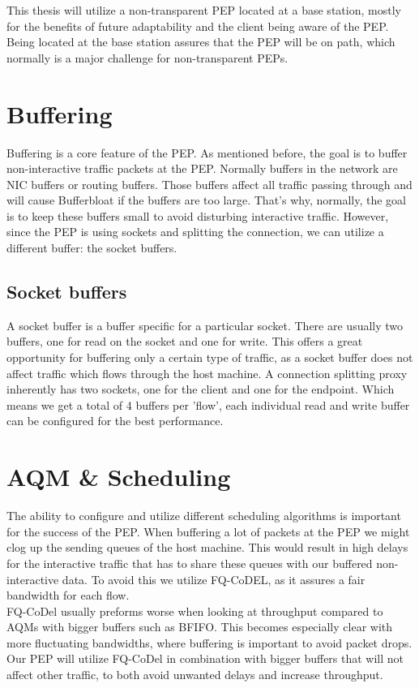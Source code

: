 \documentclass[a4paper,english, 12pt]{report}
\begin{document}
This thesis will utilize a non-transparent PEP located at a base station, mostly for the benefits of future adaptability and the client being aware of the PEP. Being located at the base station assures that the PEP will be on path, which normally is a major challenge for non-transparent PEPs.

\section{Buffering}
Buffering is a core feature of the PEP. As mentioned before, the goal is to buffer non-interactive traffic packets at the PEP. Normally buffers in the network are NIC buffers or routing buffers. Those buffers affect all traffic passing through and will cause Bufferbloat if the buffers are too large. That's why, normally, the goal is to keep these buffers small to avoid disturbing interactive traffic. However, since the PEP is using sockets and splitting the connection, we can utilize a different buffer: the socket buffers.

\subsection{Socket buffers}
A socket buffer is a buffer specific for a particular socket. There are usually two buffers, one for read on the socket and one for write. This offers a great opportunity for buffering only a certain type of traffic, as a socket buffer does not affect traffic which flows through the host machine. A connection splitting proxy inherently has two sockets, one for the client and one for the endpoint. Which means we get a total of 4 buffers per 'flow', each individual read and write buffer can be configured for the best performance.

\section{AQM \& Scheduling}
The ability to configure and utilize different scheduling algorithms is important for the success of the  PEP. When buffering a lot of packets at the PEP we might clog up the sending queues of the host machine. This would result in high delays for the interactive traffic that has to share these queues with our buffered non-interactive data. To avoid this we utilize FQ-CoDEL, as it assures a fair bandwidth for each flow.\\

FQ-CoDel usually preforms worse when looking at throughput compared to AQMs with bigger buffers such as BFIFO. This becomes especially clear with more fluctuating bandwidths, where buffering is important to avoid packet drops. Our PEP will utilize FQ-CoDel in combination with bigger buffers that will not affect other traffic, to both avoid unwanted delays and increase throughput.\\
\end{document}
